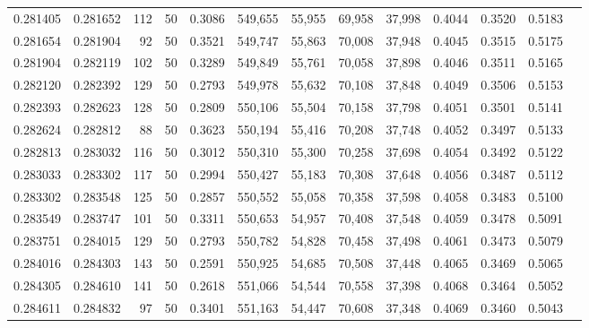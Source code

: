 \begin{tabular}{rrrrrrrrrrrrr}
0.281405 & 0.281652 &   112 &  50 &                                     0.3086 & 549,655 &  55,955 &  69,958 &  37,998 & 0.4044 & 0.3520 & 0.5183 \\
0.281654 & 0.281904 &    92 &  50 &                                     0.3521 & 549,747 &  55,863 &  70,008 &  37,948 & 0.4045 & 0.3515 & 0.5175 \\
0.281904 & 0.282119 &   102 &  50 &                                     0.3289 & 549,849 &  55,761 &  70,058 &  37,898 & 0.4046 & 0.3511 & 0.5165 \\
0.282120 & 0.282392 &   129 &  50 &                                     0.2793 & 549,978 &  55,632 &  70,108 &  37,848 & 0.4049 & 0.3506 & 0.5153 \\
0.282393 & 0.282623 &   128 &  50 &                                     0.2809 & 550,106 &  55,504 &  70,158 &  37,798 & 0.4051 & 0.3501 & 0.5141 \\
0.282624 & 0.282812 &    88 &  50 &                                     0.3623 & 550,194 &  55,416 &  70,208 &  37,748 & 0.4052 & 0.3497 & 0.5133 \\
0.282813 & 0.283032 &   116 &  50 &                                     0.3012 & 550,310 &  55,300 &  70,258 &  37,698 & 0.4054 & 0.3492 & 0.5122 \\
0.283033 & 0.283302 &   117 &  50 &                                     0.2994 & 550,427 &  55,183 &  70,308 &  37,648 & 0.4056 & 0.3487 & 0.5112 \\
0.283302 & 0.283548 &   125 &  50 &                                     0.2857 & 550,552 &  55,058 &  70,358 &  37,598 & 0.4058 & 0.3483 & 0.5100 \\
0.283549 & 0.283747 &   101 &  50 &                                     0.3311 & 550,653 &  54,957 &  70,408 &  37,548 & 0.4059 & 0.3478 & 0.5091 \\
0.283751 & 0.284015 &   129 &  50 &                                     0.2793 & 550,782 &  54,828 &  70,458 &  37,498 & 0.4061 & 0.3473 & 0.5079 \\
0.284016 & 0.284303 &   143 &  50 &                                     0.2591 & 550,925 &  54,685 &  70,508 &  37,448 & 0.4065 & 0.3469 & 0.5065 \\
0.284305 & 0.284610 &   141 &  50 &                                     0.2618 & 551,066 &  54,544 &  70,558 &  37,398 & 0.4068 & 0.3464 & 0.5052 \\
0.284611 & 0.284832 &    97 &  50 &                                     0.3401 & 551,163 &  54,447 &  70,608 &  37,348 & 0.4069 & 0.3460 & 0.5043 \\

\end{tabular}
